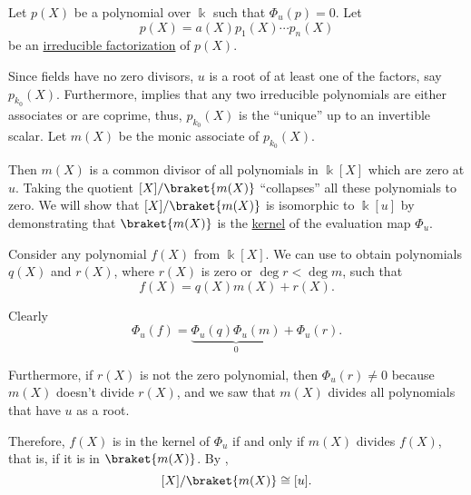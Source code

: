 \begin{defproof}
   Let \( p(X) \) be a polynomial over \( \Bbbk \) such that \( \Phi_u(p) = 0 \). Let
  \begin{equation*}
    p(X) = a(X) p_1(X) \cdots p_n(X)
  \end{equation*}
  be an \hyperref[def:irreducible_factorization]{irreducible factorization} of \( p(X) \).

  Since fields have no zero divisors, \( u \) is a root of at least one of the factors, say \( p_{k_0}(X) \). Furthermore,  implies that any two irreducible polynomials are either associates or are coprime, thus, \( p_{k_0}(X) \) is the \enquote{unique} up to an invertible scalar. Let \( m(X) \) be the monic associate of \( p_{k_0}(X) \).

  Then \( m(X) \) is a common divisor of all polynomials in \( \Bbbk[X] \) which are zero at \( u \). Taking the quotient \( \Bbbk[X] / \braket{ m(X) } \) \enquote{collapses} all these polynomials to zero. We will show that \( \Bbbk[X] / \braket{ m(X) } \) is isomorphic to \( \Bbbk[u] \) by demonstrating that \( \braket{ m(X) } \) is the \hyperref[def:algebra_over_ring/kernel]{kernel} of the evaluation map \( \Phi_u \).

  Consider any polynomial \( f(X) \) from \( \Bbbk[X] \). We can use  to obtain polynomials \( q(X) \) and \( r(X) \), where \( r(X) \) is zero or \( \deg r < \deg m \), such that
  \begin{equation*}
    f(X) = q(X) m(X) + r(X).
  \end{equation*}

  Clearly
  \begin{equation*}
    \Phi_u(f) = \underbrace{\Phi_u(q) \Phi_u(m)}_{0} + \Phi_u(r).
  \end{equation*}

  Furthermore, if \( r(X) \) is not the zero polynomial, then \( \Phi_u(r) \neq 0 \) because \( m(X) \) doesn't divide \( r(X) \), and we saw that \( m(X) \) divides all polynomials that have \( u \) as a root.

  Therefore, \( f(X) \) is in the kernel of \( \Phi_u \) if and only if \( m(X) \) divides \( f(X) \), that is, if it is in \( \braket{ m(X) } \). By ,
  \begin{equation*}
    \Bbbk[X] / \braket{ m(X) } \cong \Bbbk[u].
  \end{equation*}


\end{defproof}
